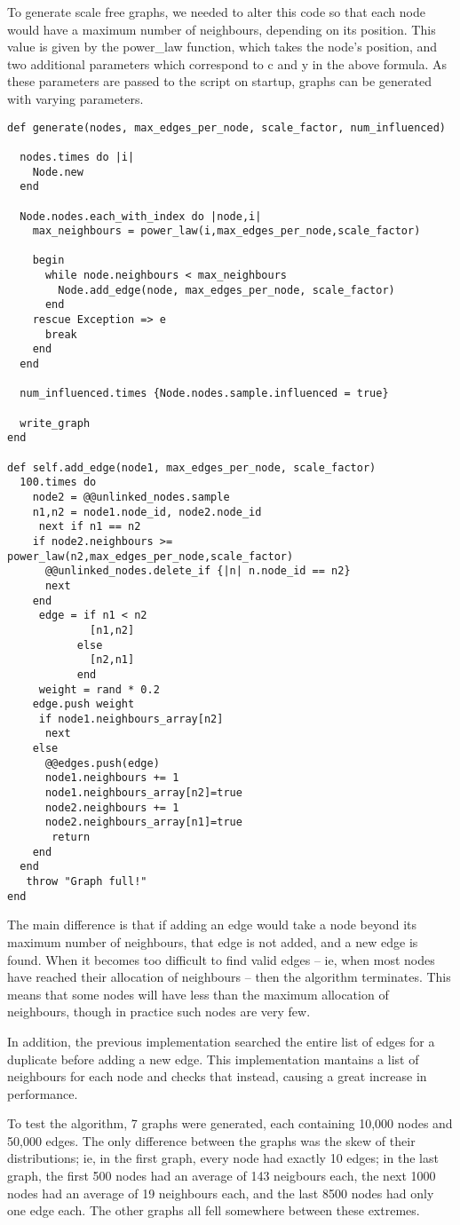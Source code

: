 To generate scale free graphs, we needed to alter this code so that each node would have a maximum number of neighbours, depending on its position. This value is given by the power\_law function, which takes the node's position, and two additional parameters which correspond to c and y in the above formula. As these parameters are passed to the script on startup, graphs can be generated with varying parameters.


\begin{verbatim}
def generate(nodes, max_edges_per_node, scale_factor, num_influenced)

  nodes.times do |i|
    Node.new
  end

  Node.nodes.each_with_index do |node,i|
    max_neighbours = power_law(i,max_edges_per_node,scale_factor)

    begin
      while node.neighbours < max_neighbours
        Node.add_edge(node, max_edges_per_node, scale_factor)
      end
    rescue Exception => e
      break
    end
  end

  num_influenced.times {Node.nodes.sample.influenced = true}

  write_graph
end

def self.add_edge(node1, max_edges_per_node, scale_factor)
  100.times do
    node2 = @@unlinked_nodes.sample
    n1,n2 = node1.node_id, node2.node_id
     next if n1 == n2
    if node2.neighbours >= power_law(n2,max_edges_per_node,scale_factor)
      @@unlinked_nodes.delete_if {|n| n.node_id == n2}
      next
    end
     edge = if n1 < n2
             [n1,n2]
           else
             [n2,n1]
           end
     weight = rand * 0.2
    edge.push weight
     if node1.neighbours_array[n2]
      next
    else
      @@edges.push(edge)
      node1.neighbours += 1
      node1.neighbours_array[n2]=true
      node2.neighbours += 1
      node2.neighbours_array[n1]=true
       return
    end
  end
   throw "Graph full!"
end

\end{verbatim}

The main difference is that if adding an edge would take a node beyond its maximum number of neighbours, that edge is not added, and a new edge is found. When it becomes too difficult to find valid edges -- ie, when most nodes have reached their allocation of neighbours -- then the algorithm terminates. This means that some nodes will have less than the maximum allocation of neighbours, though in practice such nodes are very few.

In addition, the previous implementation searched the entire list of edges for a duplicate before adding a new edge. This implementation mantains a list of neighbours for each node and checks that instead, causing a great increase in performance.

To test the algorithm, 7 graphs were generated, each containing 10,000 nodes and 50,000 edges. The only difference between the graphs was the skew of their distributions; ie, in the first graph, every node had exactly 10 edges; in the last graph, the first 500 nodes had an average of 143 neigbours each, the next 1000 nodes had an average of 19 neighbours each, and the last 8500 nodes had only one edge each. The other graphs all fell somewhere between these extremes.
